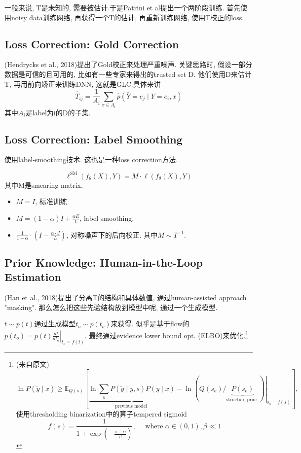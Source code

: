 \documentclass{article}
\begin{document}
一般来说, T是未知的, 需要被估计.于是Patrini et al提出一个两阶段训练. 首先使用noisy data训练网络, 再获得一个T的估计, 再重新训练网络, 使用T校正的loss.

\subsection{Loss Correction: Gold Correction}
(Hendrycks et al., 2018)提出了Gold校正来处理严重噪声. 关键思路时, 假设一部分数据是可信的且可用的, 比如有一些专家来得出的trusted set D. 他们使用D来估计T, 再用前向矫正来训练DNN, 这就是GLC.具体来讲
\begin{equation}
    \widehat{T}_{i j}=\frac{1}{A_{i}} \sum_{x \in A_{i}} \hat{p}\left(\bar{Y}=e_{j} \mid Y=e_{i}, x\right)
\end{equation}
其中$A_i$是label为i的D的子集.

\subsection{Loss Correction: Label Smoothing}
使用label-smoothing技术. 这也是一种loss correction方法.

\begin{equation}
    \ell^{\mathrm{SM}}\left(f_{\theta}(X), Y\right)=M \cdot \ell\left(f_{\theta}(X), Y\right)
\end{equation}
其中M是smearing matrix.

\begin{itemize}
    \item $M=I$, 标准训练
    \item $ M=(1-\alpha) I+\frac{\alpha E}{L}$, label smoothing.
    \item $\frac{1}{1-\alpha} \cdot\left(I-\frac{\alpha \cdot J}{L}\right)$, 对称噪声下的后向校正. 其中$M\sim T^{-1}$.
\end{itemize}

\subsection{Prior Knowledge: Human-in-the-Loop Estimation}

(Han et al., 2018)提出了分离T的结构和具体数值, 通过human-assisted approach "masking". 那么怎么把这些先验结构放到模型中呢, 通过一个生成模型.

$t \sim p(t)$通过生成模型$t_{o} \sim p\left(t_{o}\right)$来获得. 似乎是基于flow的$p\left(t_{o}\right)=\left.p(t) \frac{d t}{d t_{o}}\right|_{t_{o}=f(t)}$. 最终通过evidence lower bound opt. (ELBO)来优化.\footnote{
    (来自原文)
    \begin{equation}
        \ln P(\tilde{y} \mid x) \geq \mathbb{E}_{Q(s)}[\underbrace{\ln \sum_{y} P(\tilde{y} \mid y, s) P(y \mid x)}_{\text {previous model }}-\left.\ln (Q\left(s_{o}\right) / \underbrace{P\left(s_{o}\right)}_{\text {structure prior }})\right|_{s_{o}=f(s)}],
    \end{equation}
    使用thresholding binarization中的算子tempered sigmoid
    \begin{equation}
        f(s)=\frac{1}{1+\exp \left(-\frac{s-\alpha}{\beta}\right)}, \quad \text { where } \alpha \in(0,1), \beta \ll 1
    \end{equation}
}
\end{document}

